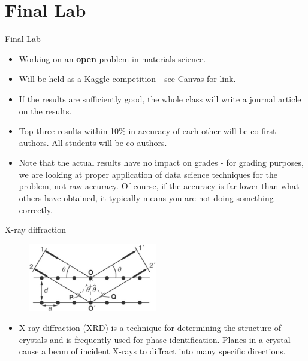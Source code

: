 \documentclass[aspectratio=169]{beamer}
\begin{document}
\section{Final Lab}

\begin{frame}{Final Lab}
    \begin{itemize}
        \item Working on an \textbf{open} problem in materials science.
        \item Will be held as a Kaggle competition - see Canvas for link.
        \item If the results are sufficiently good, the whole class will write a journal article on the results.
        \item Top three results within 10\% in accuracy of each other will be co-first authors. All students will be co-authors.
        \item Note that the actual results have no impact on grades - for grading purposes, we are looking at proper application of data science techniques for the problem, not raw accuracy. Of course, if the accuracy is far lower than what others have obtained, it typically means you are not doing something correctly.
    \end{itemize}
\end{frame}


 \begin{frame}{X-ray diffraction}
 \begin{figure}
     \centering
     \includegraphics[width=0.5\textwidth]{figures/xrd.png}
 \end{figure}
    \begin{itemize}
        \item X-ray diffraction (XRD) is a technique for determining the structure of crystals and is frequently used for phase identification. Planes in a crystal cause a beam of incident X-rays to diffract into many specific directions.
    \end{itemize}
\end{frame}
\end{document}
